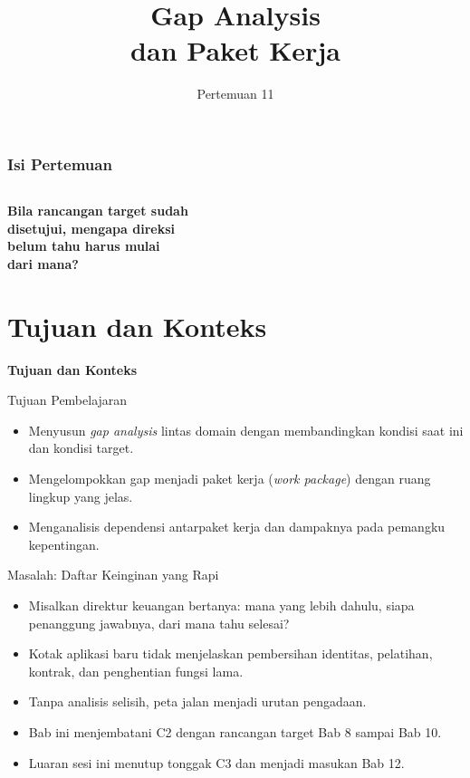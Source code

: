 \documentclass[aspectratio=169, table, 12pt]{beamer}
\title{\Huge Gap Analysis\\ \vspace{10pt} dan Paket Kerja}
\date{Pertemuan 11}
\begin{document}
\begin{frame}
  \titlepage
\end{frame}

\begin{frame}
  \frametitle{Isi Pertemuan}
  \vspace{14pt}
  \begin{columns}[t]
    {\small\tableofcontents[sections={1-3}]}

    {\small\tableofcontents[sections={4-5}]}
  \end{columns}
\end{frame}

\begin{frame}{\hfill}
  \centering
  \Huge{\textbf{Bila rancangan target sudah\\disetujui, mengapa direksi\\belum tahu harus mulai\\dari mana?}}
\end{frame}

\section{Tujuan dan Konteks}

\begin{frame}{\hfill}
  \centering
  \Huge{\textbf{Tujuan dan Konteks}}
\end{frame}

\begin{frame}{{\Large Tujuan Pembelajaran}}
  \vspace{10pt}
  \begin{itemize}
    \item Menyusun \textit{gap analysis} lintas domain dengan membandingkan kondisi saat ini dan
          kondisi target.
    \item Mengelompokkan gap menjadi paket kerja (\textit{work package}) dengan ruang lingkup yang
          jelas.
    \item Menganalisis dependensi antarpaket kerja dan dampaknya pada pemangku kepentingan.
  \end{itemize}
\end{frame}

\begin{frame}{{\Large Masalah: Daftar Keinginan yang Rapi}}
  \vspace{10pt}
  \begin{itemize}
    \item Misalkan direktur keuangan bertanya: mana yang lebih dahulu, siapa penanggung jawabnya,
          dari mana tahu selesai?
    \item Kotak aplikasi baru tidak menjelaskan pembersihan identitas, pelatihan, kontrak, dan
          penghentian fungsi lama.
    \item Tanpa analisis selisih, peta jalan menjadi urutan pengadaan.
    \item Bab ini menjembatani C2 dengan rancangan target Bab 8 sampai Bab 10.
    \item Luaran sesi ini menutup tonggak C3 dan menjadi masukan Bab 12.
  \end{itemize}
\end{frame}
\end{document}

